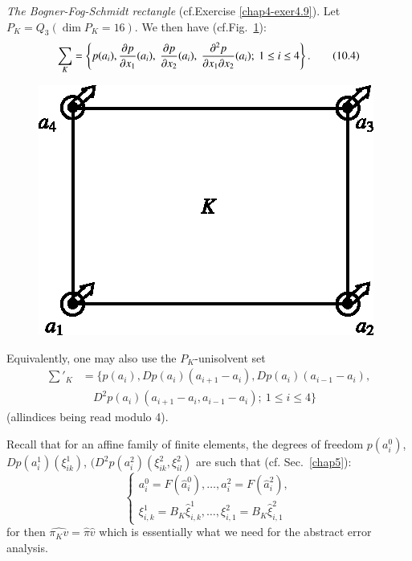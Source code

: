 \begin{example}\label{chap10-exam10.1}
{\em The Bogner-Fog-Schmidt rectangle} (cf.\@ Exercise
\ref{chap4-exer4.9}). Let $P_{K}=Q_{3}(\dim P_{K}=16)$. We then have
(cf.\@ Fig.~\ref{chap10-fig10.1}):
\begin{equation*}
\sum_{K}=\left\{p(a_{i}),\frac{\partial p}{\partial x_{1}}(a_{i}),\ \frac{\partial p}{\partial
  x_{2}}(a_{i}),\ \frac{\partial^{2}p}{\partial x_{1}\partial x_{2}}(a_{i});\ 1\leq
i\leq 4\right\}.\tag{10.4}\label{chap10-eq10.4} 
\end{equation*}
\begin{figure}[H]
\centering
\includegraphics{figure/fig10.1.eps}
\caption{}\label{chap10-fig10.1}
\end{figure}

Equivalently, one may also use the $P_{K}$-unisolvent set
\begin{equation*}
\begin{split}
\sum'_{K}&= \big\{
p(a_{i}),Dp(a_{i})(a_{i+1}-a_{i}),Dp(a_{i})(a_{i-1}-a_{i}),\\
&\quad D^{2}p(a_{i})(a_{i+1}-a_{i},a_{i-1}-a_{i});\ 1\leq i\leq 4\big\}
\end{split}\tag{10.5}\label{chap10-eq10.5}
\end{equation*}
(all\pageoriginale indices being read modulo 4).

Recall that for an affine family of finite elements, the degrees of
freedom $p(a^{0}_{i})$, $Dp(a^{1}_{i})(\xi^{1}_{ik})$,
$(D^{2}p(a^{2}_{i})(\xi^{2}_{ik},\xi^{2}_{il})$ are such that (cf.\@
Sec.~\ref{chap5}): 
\begin{equation*}
\begin{cases}
a^{0}_{i}=F(\hat{a}^{0}_{i}),\ldots,a^{2}_{i}=F(\hat{a}^{2}_{i}),\\
\xi^{1}_{i,k}=B_{K}\hat{\xi}^{1}_{i,k},\ldots,\xi^{2}_{i,1}=B_{K}\hat{\xi}^{2}_{i,1} 
\end{cases}\tag{10.6}\label{chap10-eq10.6}
\end{equation*}
for then $\widehat{\pi_{K}v}=\hat{\pi}\hat{v}$ which is essentially
what we need for the abstract error analysis.


\end{example}
